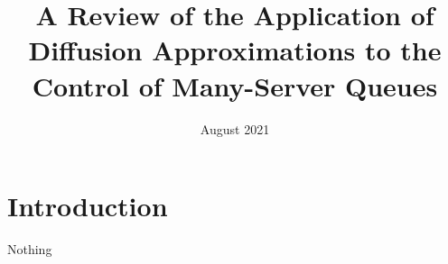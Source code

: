 \documentclass{article}
\title{A Review of the Application of Diffusion Approximations to the Control of Many-Server Queues}
\author{}
\date{August 2021}
\begin{document}
\maketitle

\section{Introduction}
Nothing
\end{document}
